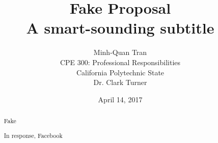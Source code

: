 


\title{\vfill Fake Proposal\\
\vspace{8pt}
\normalsize{A smart-sounding subtitle}
}

\author{Minh-Quan Tran\\
\normalsize{CPE 300: Professional Responsibilities}\\
\normalsize{California Polytechnic State}\\
\normalsize{Dr. Clark Turner}
}

\date{April 14, 2017}

\maketitle


\vfill

\begin{abstract}
Fake 

In response, Facebook
\end{abstract}

\thispagestyle{empty} 
\pagebreak